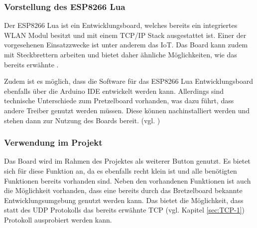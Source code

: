 \subsubsection{Vorstellung des ESP8266 Lua}        
\label{sec:Vorstellung des ESP8266} 

Der ESP8266 Lua ist ein Entwicklungsboard, welches bereits ein integriertes WLAN Modul besitzt und mit einem \ac{TCP}/\ac{IP} Stack ausgestattet ist. Einer der vorgesehenen Einsatzzwecke ist unter anderem das \ac{IoT}. Das Board kann zudem mit Steckbrettern arbeiten und bietet daher ähnliche Möglichkeiten, wie das bereits erwähnte . 

Zudem ist es möglich, dass die Software für das ESP8266 Lua Entwicklungsboard ebenfalls über die Arduino \ac{IDE} entwickelt werden kann. Allerdings sind technische Unterschiede zum Pretzelboard vorhanden, was dazu führt, dass andere Treiber genutzt werden müssen. 
Diese können nachinstalliert werden und stehen dann zur Nutzung des Boards bereit. (vgl. \cite{Carius.15.01.2017}\cite{.d})

\subsubsection{Verwendung im Projekt}        
\label{sec:Verwendung des ESP8266} 
Das Board wird im Rahmen des Projektes als weiterer Button genutzt. Es bietet sich für diese Funktion an, da es ebenfalls recht klein ist und alle benötigten Funktionen bereits vorhanden sind. Neben den vorhandenen Funktionen ist auch die Möglichkeit vorhanden, dass eine bereits durch das Bretzelboard bekannte Entwicklungsumgebung genutzt werden kann. Das bietet die Möglichkeit, dass statt des \ac{UDP} Protokolls das bereits erwähnte \ac{TCP} (vgl. Kapitel \ref{sec:TCP-1}) Protokoll ausprobiert werden kann. 

